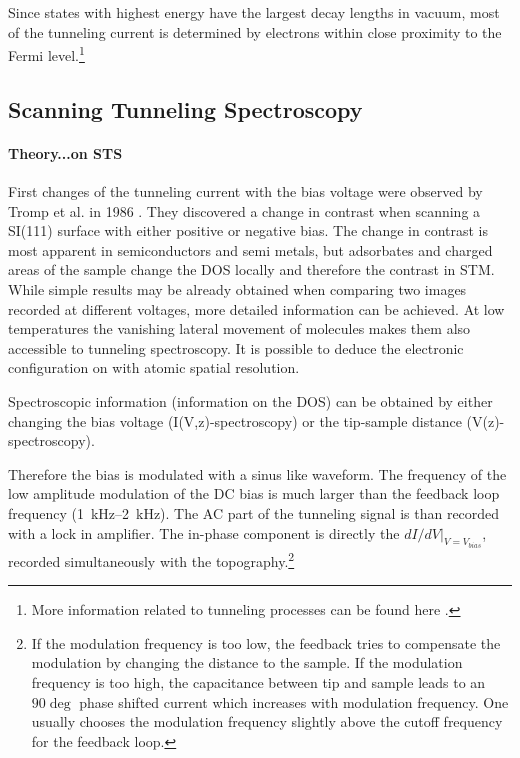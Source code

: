 Since states with highest energy have the largest decay lengths in vacuum, most of the tunneling current is determined by electrons within close proximity to the Fermi level.\footnote{More information related to tunneling processes can be found here \cite{bonnell_scanning_1993}.}

\subsection{\textbf{S}canning \textbf{T}unneling \textbf{S}pectroscopy}
\paragraph{Theory...on STS}
\label{section:STS}
First changes of the tunneling current with the bias voltage were observed by Tromp et al. in 1986 \cite{tromp_atomic_1986}. They discovered a change in contrast when scanning a SI(111) surface with either positive or negative bias. The change in contrast is most apparent in semiconductors and semi metals\cite{bonnell_scanning_1993}, but adsorbates and charged areas of the sample change the DOS locally and therefore the contrast in STM. While simple results may be already obtained when comparing two images recorded at different voltages, more detailed information can be achieved. At low temperatures the vanishing lateral movement of molecules makes them also accessible to tunneling spectroscopy. It is possible to deduce the electronic configuration on with atomic spatial resolution.

Spectroscopic information (information on the DOS) can be obtained by either changing the bias voltage (I(V,z)-spectroscopy) or the tip-sample distance (V(z)-spectroscopy).  

Therefore the bias is modulated with a sinus like waveform. The frequency of the low amplitude modulation of the DC bias is much larger than the feedback loop frequency (\SIrange{1}{2}{\kilo \hertz}). The AC part of the tunneling signal is than recorded with a lock in amplifier. The in-phase component is directly the $dI/dV|_{V=V_{bias}}$, recorded simultaneously with the topography.\footnote{If the modulation frequency is too low, the feedback tries to compensate the modulation by changing the distance to the sample.	If the modulation frequency is too high, the capacitance between tip and sample leads to an $90\deg$ phase shifted current which increases with modulation frequency. One usually chooses the modulation frequency slightly above the cutoff frequency for the feedback loop.}

